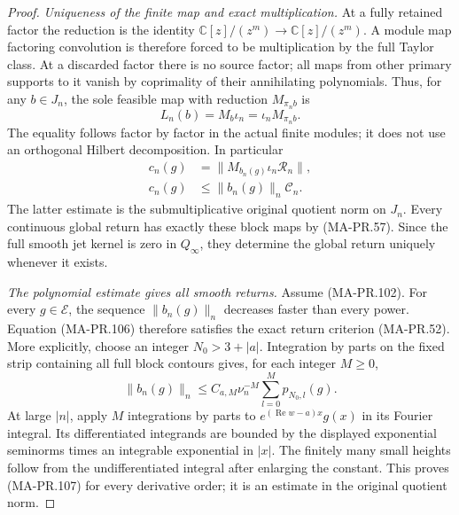 \begin{proof}
\emph{Uniqueness of the finite map and exact multiplication.}
At a fully retained factor the reduction is the identity
\(\mathbb C[z]/(z^m)\to\mathbb C[z]/(z^m)\).
A module map factoring convolution is therefore forced
to be multiplication by the full Taylor class.
At a discarded factor there is no source factor;
all maps from other primary supports to it vanish by
coprimality of their annihilating polynomials.
Thus, for any \(b\in J_n\), the sole feasible map
with reduction \(M_{\pi_nb}\) is
\[
       L_n(b)=M_b\iota_n=\iota_nM_{\pi_nb}.
 \tag{MA-PR.105}
\]
The equality follows factor by factor in the actual
finite modules; it does not use an orthogonal Hilbert
decomposition.  In particular
\[
 \begin{aligned}
 c_n(g)&=\|M_{b_n(g)}\iota_n\mathscr R_n\|,\\
 c_n(g)&\le\|b_n(g)\|_n\mathcal C_n.
 \end{aligned}
 \tag{MA-PR.106}
\]
The latter estimate is the submultiplicative original
quotient norm on \(J_n\).
Every continuous global return has exactly these
block maps by (MA-PR.57).  Since the full smooth
jet kernel is zero in \(Q_\infty\), they determine
the global return uniquely whenever it exists.

\emph{The polynomial estimate gives all smooth returns.}
Assume (MA-PR.102).  For every \(g\in\mathcal E\),
the sequence \(\|b_n(g)\|_n\) decreases faster than
every power.  Equation (MA-PR.106) therefore satisfies
the exact return criterion (MA-PR.52).
More explicitly, choose an integer \(N_0>3+|a|\).
Integration by parts on the fixed strip containing
all full block contours gives, for each integer \(M\ge0\),
\[
 \|b_n(g)\|_n\le C_{a,M}\nu_n^{-M}
                  \sum_{l=0}^{M}p_{N_0,l}(g).
 \tag{MA-PR.107}
\]
At large \(|n|\), apply \(M\) integrations by parts
to \(e^{(\operatorname{Re}w-a)x}g(x)\) in its Fourier
integral.  Its differentiated integrands are bounded
by the displayed exponential seminorms times an
integrable exponential in \(|x|\).
The finitely many small heights follow from the
undifferentiated integral after enlarging the constant.
This proves (MA-PR.107) for every derivative order;
it is an estimate in the original quotient norm.


\end{proof}
